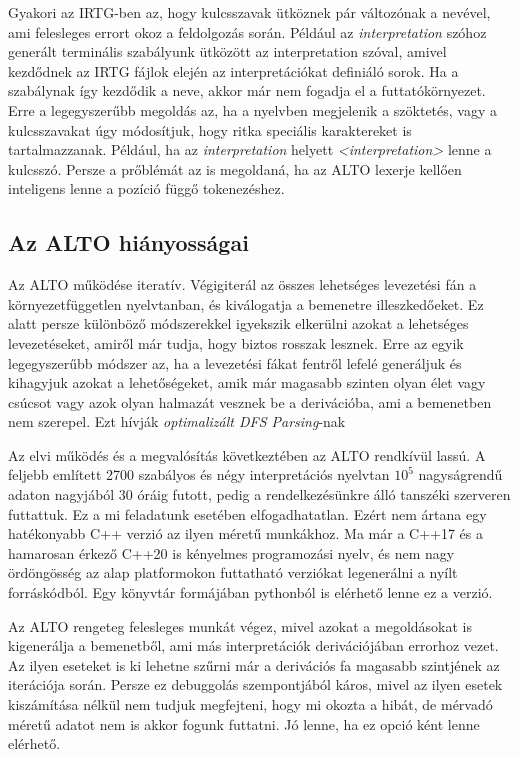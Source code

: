 Gyakori az IRTG-ben az, hogy kulcsszavak ütköznek pár változónak a nevével, ami felesleges errort okoz a feldolgozás során. Például az \textit{interpretation} szóhoz generált terminális szabályunk ütközött az interpretation szóval, amivel kezdődnek az IRTG fájlok elején az interpretációkat definiáló sorok. Ha a szabálynak így kezdődik a neve, akkor már nem fogadja el a futtatókörnyezet. Erre a legegyszerűbb megoldás az, ha a nyelvben megjelenik a szöktetés, vagy a kulcsszavakat úgy módosítjuk, hogy ritka speciális karaktereket is tartalmazzanak. Például, ha az \textit{interpretation} helyett \textit{<interpretation>} lenne a kulcsszó. Persze a prőblémát az is megoldaná, ha az ALTO lexerje kellően inteligens lenne a pozíció függő tokenezéshez.

\subsection{Az ALTO hiányosságai}
\label{sec:ALTOshortcomming}

Az ALTO működése iteratív. Végigiterál az összes lehetséges levezetési fán a környezetfüggetlen nyelvtanban, és kiválogatja a bemenetre illeszkedőeket. Ez alatt persze különböző módszerekkel igyekszik elkerülni azokat a lehetséges levezetéseket, amiről már tudja, hogy biztos rosszak lesznek. Erre az egyik legegyszerűbb módszer az, ha a levezetési fákat fentről lefelé generáljuk és kihagyjuk azokat a lehetőségeket, amik már magasabb szinten olyan élet vagy csúcsot vagy azok olyan halmazát vesznek be a derivációba, ami a bemenetben nem szerepel. Ezt hívják \textit{optimalizált DFS Parsing}-nak

Az elvi működés és a megvalósítás következtében az ALTO rendkívül lassú. A feljebb említett 2700 szabályos és négy interpretációs nyelvtan $10^5$ nagyságrendű adaton nagyjából 30 óráig futott, pedig a rendelkezésünkre álló tanszéki szerveren futtattuk. Ez a mi feladatunk esetében elfogadhatatlan. Ezért nem ártana egy hatékonyabb C++ verzió az ilyen méretű munkákhoz. Ma már a C++17 és a hamarosan érkező C++20 is kényelmes programozási nyelv, és nem nagy ördöngösség az alap platformokon futtatható verziókat legenerálni a nyílt forráskódból. Egy könyvtár formájában pythonból is elérhető lenne ez a verzió.

Az ALTO rengeteg felesleges munkát végez, mivel azokat a megoldásokat is kigenerálja a bemenetből, ami más interpretációk derivációjában errorhoz vezet. Az ilyen eseteket is ki lehetne szűrni már a derivációs fa magasabb szintjének az iterációja során. Persze ez debuggolás szempontjából káros, mivel az ilyen esetek kiszámítása nélkül nem tudjuk megfejteni, hogy mi okozta a hibát, de mérvadó méretű adatot nem is akkor fogunk futtatni. Jó lenne, ha ez opció ként lenne elérhető.

